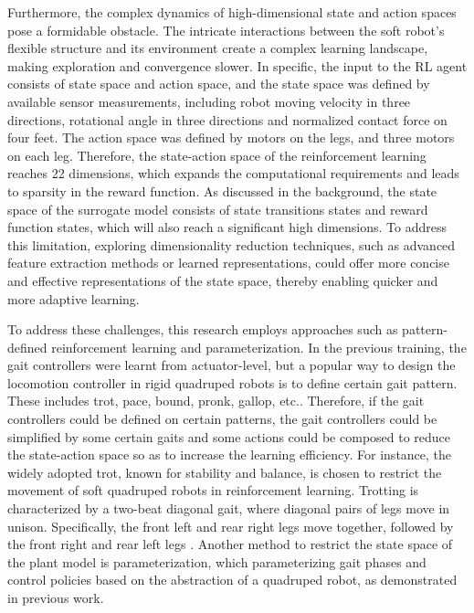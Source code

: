 Furthermore, the complex dynamics of high-dimensional state and action spaces pose a formidable obstacle. The intricate interactions between the soft robot's flexible structure and its environment create a complex learning landscape\cite{arulkumaran2017Deep}, making exploration and convergence slower. In specific, the input to the \ac{RL} agent consists of state space and action space, and the state space was defined by available sensor measurements, including robot moving velocity in three directions, rotational angle in three directions and normalized contact force on four feet. The action space was defined by motors on the legs, and three motors on each leg. Therefore, the state-action space of the reinforcement learning reaches 22 dimensions, which expands the computational requirements and leads to sparsity in the reward function. As discussed in the background, the state space of the surrogate model consists of state transitions states and reward function states, which will also reach a significant high dimensions. To address this limitation, exploring dimensionality reduction techniques, such as advanced feature extraction methods\cite{polydoros2017Survey} or learned representations\cite{wang2019Benchmarking}, could offer more concise and effective representations of the state space, thereby enabling quicker and more adaptive learning. 

To address these challenges, this research employs approaches such as pattern-defined reinforcement learning and parameterization. In the previous training\cite{ji2022Synthesizing}, the gait controllers were learnt from actuator-level, but a popular way to design the locomotion controller in rigid quadruped robots is to define certain gait pattern\cite{zhong2019Analysis}. These includes trot, pace, bound, pronk, gallop, etc.\cite{zhong2019Analysis}. Therefore, if the gait controllers could be defined on certain patterns, the gait controllers could be simplified by some certain gaits and some actions could be composed to reduce the state-action space so as to increase the learning efficiency\cite{owaki2017Quadruped}. For instance, the widely adopted trot, known for stability and balance\cite{allen1994Kinematic}, is chosen to restrict the movement of soft quadruped robots in reinforcement learning. Trotting is characterized by a two-beat diagonal gait, where diagonal pairs of legs move in unison. Specifically, the front left and rear right legs move together, followed by the front right and rear left legs \cite{fletcher2012Trot}. Another method to restrict the state space of the plant model is parameterization, which parameterizing gait phases and control policies based on the abstraction of a quadruped robot\cite{shao2022Learning}, as demonstrated in previous work\cite{ji2022Omnidirectional}.

